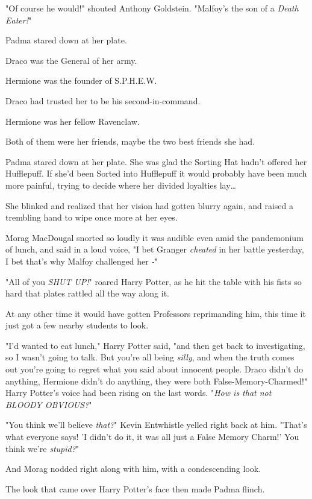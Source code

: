 "Of course he would!" shouted Anthony Goldstein. "Malfoy's the son of a \emph{Death Eater!}"

Padma stared down at her plate.

Draco was the General of her army.

Hermione was the founder of S.P.H.E.W.

Draco had trusted her to be his second-in-command.

Hermione was her fellow Ravenclaw.

Both of them were her friends, maybe the two best friends she had.

Padma stared down at her plate. She was glad the Sorting Hat hadn't offered her Hufflepuff. If she'd been Sorted into Hufflepuff it would probably have been much more painful, trying to decide where her divided loyalties lay{\ldots}

She blinked and realized that her vision had gotten blurry again, and raised a trembling hand to wipe once more at her eyes.

Morag MacDougal snorted so loudly it was audible even amid the pandemonium of lunch, and said in a loud voice, "I bet Granger \emph{cheated} in her battle yesterday, I bet that's why Malfoy challenged her \emph{-}"

"All of you \emph{SHUT UP!}" roared Harry Potter, as he hit the table with his fists so hard that plates rattled all the way along it.

At any other time it would have gotten Professors reprimanding him, this time it just got a few nearby students to look.

"I'd wanted to eat lunch," Harry Potter said, "and then get back to investigating, so I wasn't going to talk. But you're all being \emph{silly}, and when the truth comes out you're going to regret what you said about innocent people. Draco didn't do anything, Hermione didn't do anything, they were both False-Memory-Charmed!" Harry Potter's voice had been rising on the last words. "\emph{How is that not BLOODY OBVIOUS?}"

"You think we'll believe\emph{ that?}" Kevin Entwhistle yelled right back at him. "That's what everyone says! 'I didn't do it, it was all just a False Memory Charm!' You think we're \emph{stupid?}"

And Morag nodded right along with him, with a condescending look.

The look that came over Harry Potter's face then made Padma flinch.

